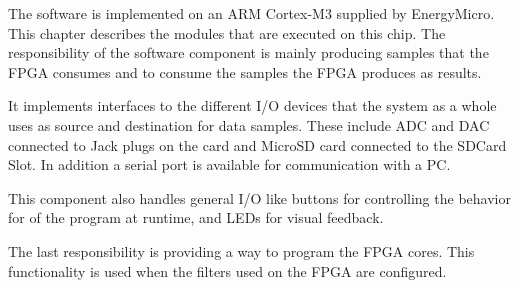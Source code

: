 The software is implemented on an ARM Cortex-M3 supplied by
EnergyMicro. This chapter describes the modules that are
executed on this chip. The responsibility of the software
component is mainly producing samples that the FPGA consumes and
to consume the samples the FPGA produces as results.

It implements interfaces to the different I/O devices that the
system as a whole uses as source and destination for data
samples. These include ADC and DAC connected to Jack plugs on
the card and MicroSD card connected to the SDCard Slot. In
addition a serial port is available for communication with a PC.

This component also handles general I/O like buttons for
controlling the behavior for of the program at runtime, and LEDs
for visual feedback.

The last responsibility is providing a way to program the FPGA
cores. This functionality is used when the filters used on the
FPGA are configured. 
